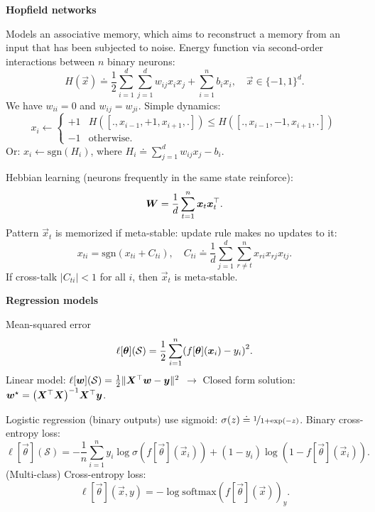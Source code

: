 \documentclass[10pt]{article}
\newenvironment{topic}[1]
{\textbf{\sffamily \colorbox{black}{\rlap{\textbf{\textcolor{white}{#1}}}\hspace{\linewidth}\hspace{-2\fboxsep}}}}
{}
\newenvironment{subtopic}[1]
{\begin{center}\textbf{\sffamily #1}\end{center}}
{}
\begin{document}
\begin{multicols*}{3}
\begin{topic}{Connectionism}
        \begin{subtopic}{Hopfield networks}
            Models an associative memory, which aims to reconstruct a memory from an input that has been subjected to noise. Energy function via second-order interactions between $n$ binary neurons: \[
                H(\vec{x}) \doteq \frac{1}{2} \sum_{i=1}^{d} \sum_{j=1}^{d} w_{ij}x_ix_j + \sum_{i=1}^{n} b_ix_i, \quad \vec{x} \in \{ -1, 1 \}^d.
            \]
            We have $w_{ii} = 0$ and $w_{ij} = w_{ji}$. Simple dynamics: \[
                x_i \gets \begin{cases}
                    +1 & H([., x_{i-1}, +1, x_{i+1}, .]) \leq H([., x_{i-1}, -1, x_{i+1}, .]) \\
                    -1 & \mathrm{otherwise}.
                \end{cases}
            \]
            Or: $x_i \gets \mathrm{sgn}(H_i)$, where $H_i \doteq \sum_{j=1}^{d} w_{ij} x_j - b_i$.

            Hebbian learning (neurons frequently in the same state reinforce): \[
                \bm{W} = \frac{1}{d} \sum_{t=1}^{n} \bm{x}_t \bm{x}_t^\top.
            \]
            Pattern $\vec{x}_t$ is memorized if meta-stable: update rule makes no updates to it: \[
                x_{ti} = \mathrm{sgn}(x_{ti} + C_{ti}), \quad C_{ti} \doteq \frac{1}{d} \sum_{j=1}^{d} \sum_{r\neq t}^{n} x_{ri}x_{rj}x_{tj}.
            \]
            If cross-talk $|C_{ti}| < 1$ for all $i$, then $\vec{x}_t$ is meta-stable.
        \end{subtopic}

    \end{topic}

    \begin{topic}{Feedforward networks}

        \begin{subtopic}{Regression models}
            Mean-squared error \[
                \ell[\vec{\theta}](\mathcal{S}) = \frac{1}{2} \sum_{i=1}^{n} \lft( f[\vec{\theta}](\vec{x}_i) - y_i \rgt)^2.
            \]
            Linear model: $\ell[\bm{w}](\mathcal{S}) = \frac{1}{2} \| \bm{X}^\top \bm{w} - \bm{y}
                \|^2$ $\to$ Closed form solution: $\vec{w}^\star = \inv{\lft( \transpose{\mat{X}}\mat{X}
                    \rgt)}\transpose{\mat{X}} \vec{y}$.

            Logistic regression (binary outputs) use sigmoid: $\sigma(z) \doteq \nicefrac{1}{1 + \exp(-z)}$.
            Binary cross-entropy loss: \[
                \ell[\vec{\theta}](\mathcal{S}) = -\frac{1}{n} \sum_{i=1}^{n} y_i \log \sigma(f[\vec{\theta}](\vec{x}_i)) + (1-y_i)\log(1-f[\vec{\theta}](\vec{x}_i)).
            \] (Multi-class) Cross-entropy loss: \[
                \ell[\vec{\theta}](\vec{x},y) = -\log \mathrm{softmax}(f[\vec{\theta}](\vec{x}))_y.
            \]
        \end{subtopic}


\end{topic}
\end{multicols*}
\end{document}
